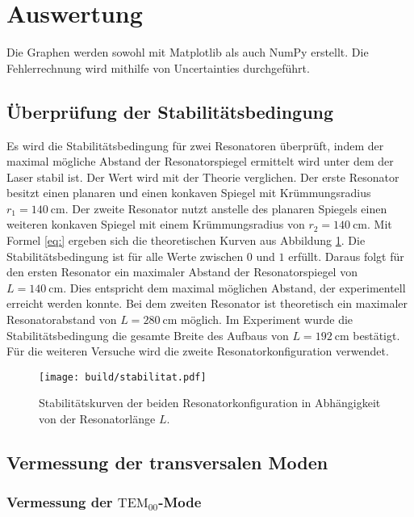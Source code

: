 \section{Auswertung}
\label{sec:Auswertung}

Die Graphen werden sowohl mit Matplotlib \cite{matplotlib} als auch NumPy \cite{numpy} erstellt. Die Fehlerrechnung wird mithilfe von Uncertainties \cite{uncertainties} durchgeführt.

\subsection{Überprüfung der Stabilitätsbedingung}

Es wird die Stabilitätsbedingung für zwei Resonatoren überprüft, indem der maximal mögliche Abstand der Resonatorspiegel ermittelt wird unter dem der Laser stabil ist. Der Wert wird mit der Theorie verglichen. Der erste Resonator besitzt einen planaren und einen konkaven Spiegel mit Krümmungsradius $r_1=\SI{140}{\centi\metre}$.    
Der zweite Resonator nutzt anstelle des planaren Spiegels einen weiteren konkaven Spiegel mit einem Krümmungsradius von $r_2=\SI{140}{\centi\metre}$. 
Mit Formel \eqref{eq:} ergeben sich die theoretischen Kurven aus Abbildung \ref{fig:stabilität}. 
Die Stabilitätsbedingung ist für alle Werte zwischen $0$ und $1$ erfüllt. Daraus folgt für den ersten Resonator ein maximaler Abstand der Resonatorspiegel von $L=\SI{140}{\centi\metre}$. Dies entspricht dem maximal möglichen Abstand, der experimentell erreicht werden konnte.
Bei dem zweiten Resonator ist theoretisch ein maximaler Resonatorabstand von $L=\SI{280}{\centi\metre}$ möglich. Im Experiment wurde die Stabilitätsbedingung die gesamte Breite des Aufbaus von $L=\SI{192}{\centi\metre}$ bestätigt. Für die weiteren Versuche wird die zweite Resonatorkonfiguration verwendet.

\begin{figure}
	\centering
	\texttt{[image: build/stabilitat.pdf]}
	\caption{Stabilitätskurven der beiden Resonatorkonfiguration in Abhängigkeit von der Resonatorlänge $L$.}
	\label{fig:stabilität}
\end{figure}

\subsection{Vermessung der transversalen Moden}
\subsubsection{Vermessung der $\mathrm{TEM}_{00}$-Mode}

